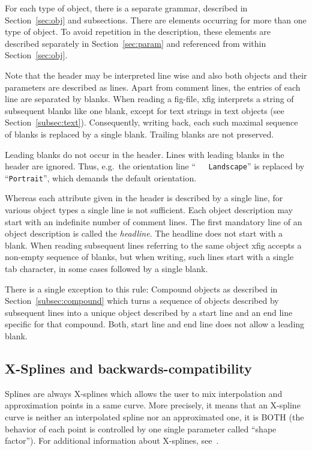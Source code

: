 \documentclass[10pt, a4paper]{article}%
\begin{document}
For each type of object, there is a separate grammar, 
described in Section~\ref{sec:obj} and subsections. 
There are elements occurring for more than one type of object. 
To avoid repetition in the description, 
these elements are described separately in Section~\ref{sec:param} 
and referenced from within Section~\ref{sec:obj}. 

Note that the header may be interpreted line wise 
and also both objects and their parameters are described as lines. 
Apart from comment lines, the entries of each line are separated by blanks. 
When reading a fig-file, 
xfig interprets a string of subsequent blanks like one blank, 
except for text strings in text objects (see Section~\ref{subsec:text}). 
Consequently, writing back, each such maximal sequence of blanks 
is replaced by a single blank. 
Trailing blanks are not preserved. 

Leading blanks do not occur in the header. 
Lines with leading blanks in the header are ignored. 
Thus, e.g.~the orientation line 
``\texttt{\ \ \ Landscape}'' is replaced by ``\texttt{Portrait}'', 
which demands the default orientation. 

Whereas each attribute given in the header is described by a single line, 
for various object types a single line is not sufficient. 
Each object description may start with an indefinite number of comment lines. 
The first mandatory line of an object description is called the \emph{headline}. 
The headline does not start with a blank. 
When reading subsequent lines referring to the same object 
xfig accepts a non-empty sequence of blanks, 
but when writing, such lines start with a single tab character, 
in some cases followed by a single blank. 

There is a single exception to this rule: 
Compound objects as described in Section~\ref{subsec:compound} 
which turns a sequence of objects described by subsequent lines 
into a unique object described by a 
start line and an end line specific for that compound. 
Both, start line and end line does not allow a leading blank. 


\subsection{X-Splines and backwards-compatibility}

Splines are always X-splines 
which allows the user to mix interpolation and approximation 
points in a same curve. 
More precisely, it means that an X-spline curve 
is neither an interpolated spline nor an approximated one, 
it is BOTH (the behavior of each point 
is controlled by one single parameter called ``shape factor''). 
For additional information about X-splines, see~\cite{XSpline}. 
\end{document}

